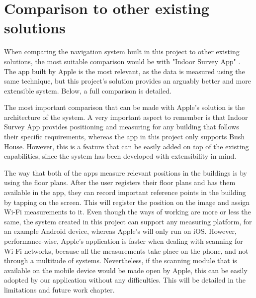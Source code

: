 

\section{Comparison to other existing solutions}
\label{sec:comparison}
When comparing the navigation system built in this project to other existing solutions, the most suitable comparison would be with "Indoor Survey App" \cite{apple-indoor-survey}. The app built by Apple is the most relevant, as the data is measured using the same technique, but this project's solution provides an arguably better and more extensible system. Below, a full comparison is detailed.

The most important comparison that can be made with Apple's solution is the architecture of the system. A very important aspect to remember is that Indoor Survey App provides positioning and measuring for any building that follows their specific requirements, whereas the app in this project only supports Bush House. However, this is a feature that can be easily added on top of the existing capabilities, since the system has been developed with extensibility in mind.

The way that both of the apps measure relevant positions in the buildings is by using the floor plans. After the user registers their floor plans and has them available in the app, they can record important reference points in the building by tapping on the screen. This will register the position on the image and assign Wi-Fi measurements to it. Even though the ways of working are more or less the same, the system created in this project can support any measuring platform, for an example Android device, whereas Apple's will only run on iOS. However, performance-wise, Apple's application is faster when dealing with scanning for Wi-Fi networks, because all the measurements take place on the phone, and not through a multitude of systems. Nevertheless, if the scanning module that is available on the mobile device would be made open by Apple, this can be easily adopted by our application without any difficulties. This will be detailed in the limitations and future work chapter.

